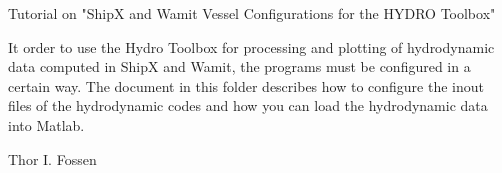 Tutorial on "ShipX and Wamit Vessel Configurations for the HYDRO Toolbox"


It order to use the Hydro Toolbox for processing and plotting of hydrodynamic data computed in ShipX and Wamit, the programs must be configured in a certain way. The document in this folder describes how to configure the inout files of the hydrodynamic codes and how you can load the hydrodynamic data into Matlab.

Thor I. Fossen